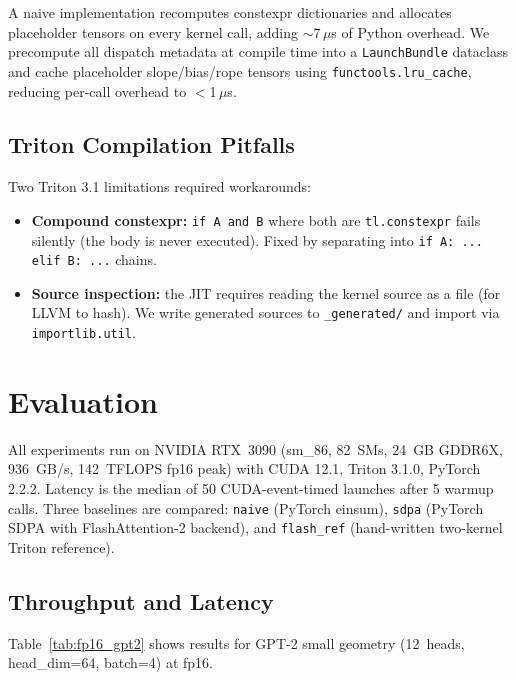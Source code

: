 \documentclass[10pt,twocolumn]{article}
\begin{document}
A naive implementation recomputes constexpr dictionaries and allocates
placeholder tensors on every kernel call, adding $\sim$7\,$\mu$s of Python
overhead.  We precompute all dispatch metadata at compile time into a
\texttt{LaunchBundle} dataclass and cache placeholder slope/bias/rope tensors
using \texttt{functools.lru\_cache}, reducing per-call overhead to $<$1\,$\mu$s.

\subsection{Triton Compilation Pitfalls}

Two Triton 3.1 limitations required workarounds:
\begin{itemize}[leftmargin=1.2em,itemsep=1pt]
  \item \textbf{Compound constexpr:} \texttt{if A and B} where both are
        \texttt{tl.constexpr} fails silently (the body is never executed).
        Fixed by separating into \texttt{if A: ... elif B: ...} chains.
  \item \textbf{Source inspection:} the JIT requires reading the kernel
        source as a file (for LLVM to hash).  We write generated sources to
        \texttt{\_generated/} and import via \texttt{importlib.util}.
\end{itemize}

\section{Evaluation}

All experiments run on NVIDIA RTX~3090 (sm\_86, 82~SMs, 24~GB GDDR6X,
936~GB/s, 142~TFLOPS fp16 peak) with CUDA 12.1, Triton 3.1.0, PyTorch 2.2.2.
Latency is the median of 50 CUDA-event-timed launches after 5 warmup calls.
Three baselines are compared: \texttt{naive} (PyTorch einsum),
\texttt{sdpa} (PyTorch SDPA with FlashAttention-2 backend), and
\texttt{flash\_ref} (hand-written two-kernel Triton reference).

\subsection{Throughput and Latency}

Table~\ref{tab:fp16_gpt2} shows results for GPT-2 small geometry
(12~heads, head\_dim=64, batch=4) at fp16.
\end{document}
